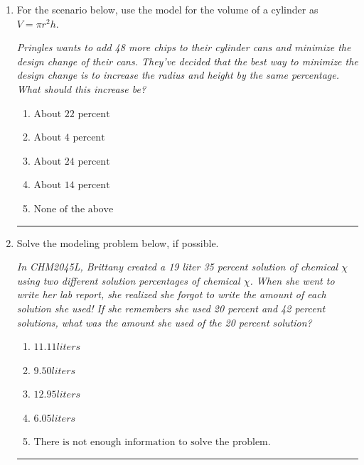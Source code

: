 \documentclass[14pt]{extbook}
\newcommand{\litem}[1]{\item#1\hspace*{-1cm}\rule{\textwidth}{0.4pt}}
\begin{document}
\begin{enumerate}
{\begin{enumerate}[label=\Alph*.]
\end{enumerate} }
\litem{
For the scenario below, use the model for the volume of a cylinder as $V = \pi r^2 h$.
\begin{center}
    \textit{ Pringles wants to add 48 \text{percent} more chips to their cylinder cans and minimize the design change of their cans. They've decided that the best way to minimize the design change is to increase the radius and height by the same percentage. What should this increase be? }
\end{center}
\begin{enumerate}[label=\Alph*.]
\item \( \text{About } 22 \text{ percent} \)
\item \( \text{About } 4 \text{ percent} \)
\item \( \text{About } 24 \text{ percent} \)
\item \( \text{About } 14 \text{ percent} \)
\item \( \text{None of the above} \)

\end{enumerate} }
\litem{
Solve the modeling problem below, if possible.
\begin{center}
    \textit{ In CHM2045L, Brittany created a 19 liter 35 percent solution of chemical $\chi$ using two different solution percentages of chemical $\chi$. When she went to write her lab report, she realized she forgot to write the amount of each solution she used! If she remembers she used 20 percent and 42 percent solutions, what was the amount she used of the 20 percent solution? }
\end{center}
\begin{enumerate}[label=\Alph*.]
\item \( 11.11 liters \)
\item \( 9.50 liters \)
\item \( 12.95 liters \)
\item \( 6.05 liters \)
\item \( \text{There is not enough information to solve the problem.} \)


\end{enumerate}}
\end{enumerate}
\end{document}
